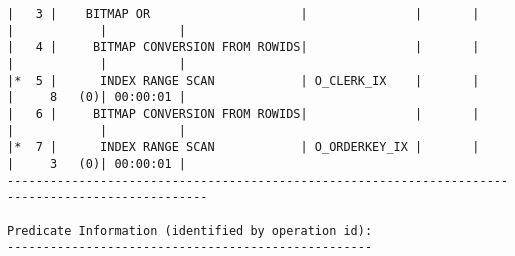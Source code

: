 \documentclass[11pt,a4paper,parskip=half]{scrartcl}
\begin{document}
\begin{lstlisting}
|   3 |    BITMAP OR                     |               |       |       |            |          |                                                                                                                                                                                                           
|   4 |     BITMAP CONVERSION FROM ROWIDS|               |       |       |            |          |                                                                                                                                                                                                           
|*  5 |      INDEX RANGE SCAN            | O_CLERK_IX    |       |       |     8   (0)| 00:00:01 |                                                                                                                                                                                                           
|   6 |     BITMAP CONVERSION FROM ROWIDS|               |       |       |            |          |                                                                                                                                                                                                           
|*  7 |      INDEX RANGE SCAN            | O_ORDERKEY_IX |       |       |     3   (0)| 00:00:01 |                                                                                                                                                                                                           
--------------------------------------------------------------------------------------------------                                                                                                                                                                                                           
                                                                                                                                                                                                                                                                                                             
Predicate Information (identified by operation id):                                                                                                                                                                                                                                                          
---------------------------------------------------                                                                                                                                                                                                                                                          
                                                                                                                                                                                                                                                                                                             

\end{lstlisting}
\end{document}
